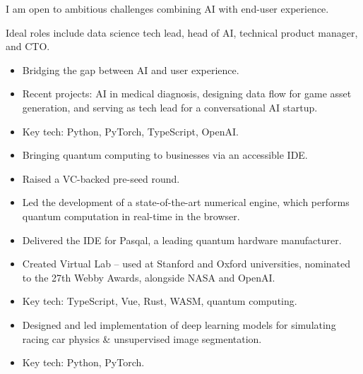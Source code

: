 \documentclass[10pt,a4paper,ragged2e,withhyper]{altacv}
\begin{document}
\begin{paracol}{2}


I am open to ambitious challenges combining AI with end-user experience.

\divider

Ideal roles include data science tech lead, head of AI, technical product manager, and CTO.


\begin{itemize}
\item Bridging the gap between AI and user experience.
\item Recent projects: AI in medical diagnosis, designing data flow for game asset generation, and serving as tech lead for a conversational AI startup.
\item Key tech: Python, PyTorch, TypeScript, OpenAI.
\end{itemize}

\begin{itemize}
\item Bringing quantum computing to businesses via an accessible IDE.
\item Raised a VC-backed pre-seed round.
\item Led the development of a state-of-the-art numerical engine, which performs quantum computation in real-time in the browser.
\item Delivered the IDE for Pasqal, a leading quantum hardware manufacturer.
\item Created Virtual Lab -- used at Stanford and Oxford universities, nominated to the 27th Webby Awards, alongside NASA and OpenAI.
\item Key tech: TypeScript, Vue, Rust, WASM, quantum computing.
\end{itemize}

\divider

\begin{itemize}
\item Designed and led implementation of deep learning models for simulating racing car physics \& unsupervised image segmentation.
\item Key tech: Python, PyTorch.
\end{itemize}


\end{paracol}
\end{document}

